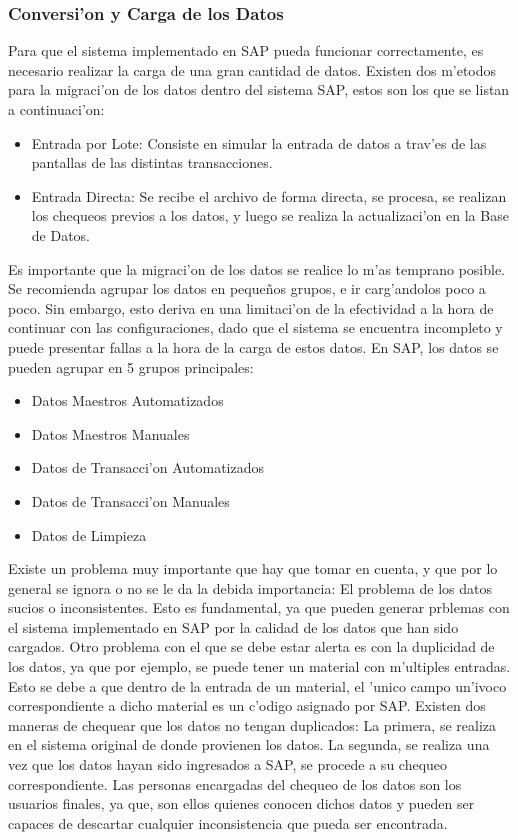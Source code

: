 \subsubsection{Conversi'on y Carga de los Datos}
	Para que el sistema implementado en SAP pueda funcionar correctamente, es necesario realizar la carga de una gran cantidad de datos. 
	Existen dos m'etodos para la migraci'on de los datos dentro del sistema SAP, estos son los que se listan a continuaci'on:
\begin{itemize}
\item Entrada por Lote: Consiste en simular la entrada de datos a trav'es de las pantallas de las distintas transacciones.
\item Entrada Directa: Se recibe el archivo de forma directa, se procesa, se realizan los chequeos previos a los datos, y luego se realiza la actualizaci'on en la Base de Datos.
\end{itemize}
	Es importante que la migraci'on de los datos se realice lo m'as temprano posible. Se recomienda agrupar los datos en peque\~nos grupos, e ir carg'andolos poco a poco. Sin embargo, esto deriva en una limitaci'on de la efectividad a la hora de continuar con las configuraciones, dado que el sistema se encuentra incompleto y puede presentar fallas a la hora de la carga de estos datos.
	En SAP, los datos se pueden agrupar en 5 grupos principales:
\begin{itemize}
\item Datos Maestros Automatizados
\item Datos Maestros Manuales
\item Datos de Transacci'on Automatizados
\item Datos de Transacci'on Manuales
\item Datos de Limpieza
\end{itemize}
	Existe un problema muy importante que hay que tomar en cuenta, y que por lo general se ignora o no se le da la debida importancia: El problema de los datos sucios o inconsistentes. Esto es fundamental, ya que pueden generar prblemas con el sistema implementado en SAP por la calidad de los datos que han sido cargados. 
	Otro problema con el que se debe estar alerta es con la duplicidad de los datos, ya que por ejemplo, se puede tener un material con m'ultiples entradas. Esto se debe a que dentro de la entrada de un material, el 'unico campo un'ivoco correspondiente a dicho material es un c'odigo asignado por SAP. 
	Existen dos maneras de chequear que los datos no tengan duplicados: La primera, se realiza en el sistema original de donde provienen los datos. La segunda, se realiza una vez que los datos hayan sido ingresados a SAP, se procede a su chequeo correspondiente.
	Las personas encargadas del chequeo de los datos son los usuarios finales, ya que, son ellos quienes conocen dichos datos y pueden ser capaces de descartar cualquier inconsistencia que pueda ser encontrada.

